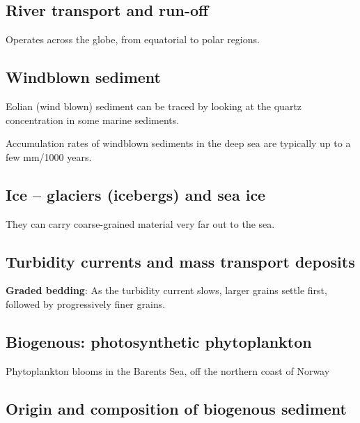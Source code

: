 \subsection{River transport and run-off}

Operates across the globe, from equatorial to polar regions.

\subsection{Windblown sediment}

Eolian (wind blown) sediment can be traced by looking at the quartz
concentration in some marine sediments.

Accumulation rates of windblown sediments in the deep sea are typically up to
a few mm/1000 years.

\subsection{Ice -- glaciers (icebergs) and sea ice}

They can carry coarse-grained material very far out to the sea.

\subsection{Turbidity currents and mass transport deposits}

\textbf{Graded bedding}: As the turbidity current slows, larger grains
settle first, followed by progressively finer grains.

\subsection{Biogenous: photosynthetic phytoplankton}

Phytoplankton blooms in the Barents Sea, off the northern coast of Norway

\subsection{Origin and composition of biogenous sediment}

